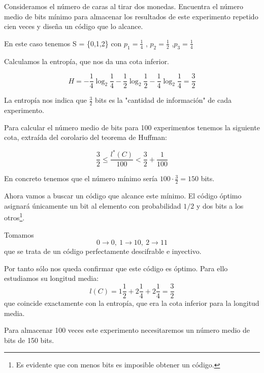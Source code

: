 \begin{problem}[5]
Consideramos el número de caras al tirar dos monedas. Encuentra el número medio de bits mínimo para almacenar los resultados de este experimento repetido cien veces y diseña un código que lo alcance.
\solution

En este caso tenemos S = \{0,1,2\} con $p_1 = \frac{1}{4}$ , $p_2 = \frac{1}{2}$ ,$p_3 = \frac{1}{4}$

	Calculamos la entropía, que nos da una cota inferior.

	$$H = - \frac{1}{4} \log_2 \frac{1}{4} - \frac{1}{2}\log_2 \frac{1}{2}  - \frac{1}{4} \log_2 \frac{1}{4} = \frac{3}{2}$$

	La entropía nos indica que $\frac{3}{2}$ bits es la "cantidad de información" de cada experimento.

	Para calcular el número medio de bits para 100 experimentos tenemos la siguiente cota, extraída del corolario del teorema de Huffman:

	$$\frac{3}{2} \leq \frac{l^{*}(C)}{100} < \frac{3}{2} + \frac{1}{100}$$

	En concreto tenemos que el número mínimo sería $100 \cdot \frac{3}{2} = 150$ bits.

	Ahora vamos a buscar un código que alcance este mínimo. El código óptimo asignará únicamente un bit al elemento con probabilidad $1/2$ y dos bits a los otros\footnote{Es evidente que con menos bits es imposible obtener un código.}.

	Tomamos
	\[0 \to 0, \ 1\to 10, \ 2\to 11\]
	que se trata de un código perfectamente descifrable e inyectivo.

	Por tanto sólo nos queda confirmar que este código es óptimo. Para ello estudiamos su longitud media:
	\[l(C)=1\frac{1}{2}+2\frac{1}{4}+2\frac{1}{4} = \frac{3}{2}\]
	que coincide exactamente con la entropía, que era la cota inferior para la longitud media.

	Para almacenar 100 veces este experimento necesitaremos un número medio de bits de 150 bits.

\end{problem}

